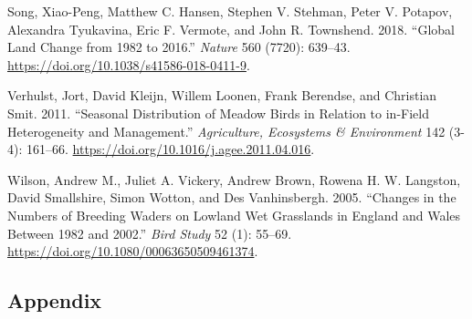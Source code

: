 \documentclass[
  12pt,
  letterpaper,
  DIV=11,
  numbers=noendperiod]{scrartcl}
\newlength{\cslhangindent}
\newenvironment{CSLReferences}[2] %
 {\begin{list}{}{%
  \setlength{\itemindent}{0pt}
  \setlength{\leftmargin}{0pt}
  \setlength{\parsep}{0pt}
  \ifodd #1
   \setlength{\leftmargin}{\cslhangindent}
   \setlength{\itemindent}{-1\cslhangindent}
  \fi
  \setlength{\itemsep}{#2\baselineskip}}}
 {\end{list}}
\begin{document}
\begin{CSLReferences}{1}{0}
Song, Xiao-Peng, Matthew C. Hansen, Stephen V. Stehman, Peter V.
Potapov, Alexandra Tyukavina, Eric F. Vermote, and John R. Townshend.
2018. {``Global Land Change from 1982 to 2016.''} \emph{Nature} 560
(7720): 639--43. \url{https://doi.org/10.1038/s41586-018-0411-9}.

Verhulst, Jort, David Kleijn, Willem Loonen, Frank Berendse, and
Christian Smit. 2011. {``Seasonal Distribution of Meadow Birds in
Relation to in-Field Heterogeneity and Management.''} \emph{Agriculture,
Ecosystems \& Environment} 142 (3-4): 161--66.
\url{https://doi.org/10.1016/j.agee.2011.04.016}.

Wilson, Andrew M., Juliet A. Vickery, Andrew Brown, Rowena H. W.
Langston, David Smallshire, Simon Wotton, and Des Vanhinsbergh. 2005.
{``Changes in the Numbers of Breeding Waders on Lowland Wet Grasslands
in England and Wales Between 1982 and 2002.''} \emph{Bird Study} 52 (1):
55--69. \url{https://doi.org/10.1080/00063650509461374}.

\end{CSLReferences}

\newpage{}

\subsection{Appendix}\label{appendix}

\beginsupplement

\begingroup\fontsize{7}{9}\selectfont
\end{document}
